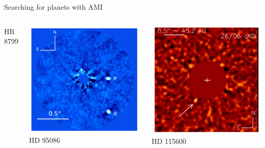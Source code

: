 \documentclass[10pt]{beamer}
\begin{document}
\begin{frame}{Searching for planets with AMI}
  \begin{columns}
    \centering
    HR 8799

    \includegraphics[width=\textwidth]{figures/hr8799_image.png}
    \centering
    HD 95086

    \includegraphics[width=\textwidth]{figures/hd95086_image.png}
    \centering
    HD 115600


\end{columns}
\end{frame}
\end{document}
